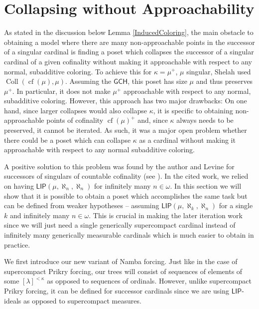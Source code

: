 \documentclass[a4paper]{amsart}
\theoremstyle{definition}
\theoremstyle{remark}
\theoremstyle{plain}
\numberwithin{mydef}{section}
\DeclareMathOperator{\cf}{cf}
\DeclareMathOperator{\Coll}{Coll}
\newcommand{\GCH}{\mathsf{GCH}}
\newcommand{\LIP}{\mathsf{LIP}}
\begin{document}
	\section{Collapsing without Approachability}\label{CollapseNoApp}
	
	As stated in the discussion below Lemma \ref{InducedColoring}, the main obstacle to obtaining a model where there are many non-approachable points in the successor of a singular cardinal is finding a poset which collapses the successor of a singular cardinal of a given cofinality without making it approachable with respect to any normal, subadditive coloring. To achieve this for $\kappa=\mu^+$, $\mu$ singular, Shelah used $\Coll(\cf(\mu),\mu)$. Assuming the $\GCH$, this poset has size $\mu$ and thus preserves $\mu^+$. In particular, it does not make $\mu^+$ approachable with respect to any normal, subadditive coloring. However, this approach has two major drawbacks: On one hand, since larger collapses would also collapse $\kappa$, it is specific to obtaining non-approachable points of cofinality $\cf(\mu)^+$ and, since $\kappa$ always needs to be preserved, it cannot be iterated. As such, it was a major open problem whether there could be a poset which can collapse $\kappa$ as a cardinal without making it approachable with respect to any normal subadditive coloring.	
	
	A positive solution to this problem was found by the author and Levine for successors of singulars of countable cofinality (see \cite{JakobLevineFailureApproachability}). In the cited work, we relied on having $\LIP(\mu,\aleph_n,\aleph_n)$ for infinitely many $n\in\omega$. In this section we will show that it is possible to obtain a poset which accomplishes the same task but can be defined from weaker hypotheses -- assuming $\LIP(\mu,\aleph_k,\aleph_n)$ for a single $k$ and infinitely many $n\in\omega$. This is crucial in making the later iteration work since we will just need a single generically supercompact cardinal instead of infinitely many generically measurable cardinals which is much easier to obtain in practice.
	
	We first introduce our new variant of Namba forcing. Just like in the case of supercompact Prikry forcing, our trees will consist of sequences of elements of some $[\lambda]^{<\kappa}$ as opposed to sequences of ordinals. However, unlike supercompact Prikry forcing, it can be defined for successor cardinals since we are using $\LIP$-ideals as opposed to supercompact measures.
	
\end{document}
